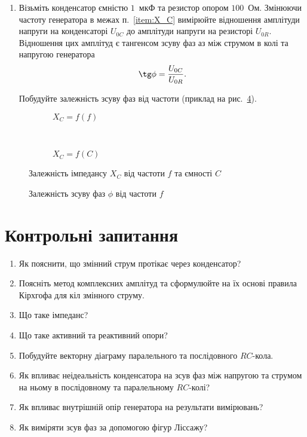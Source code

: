 \begin{enumerate}[resume]
\item Візьміть конденсатор ємністю $1$~мкФ та резистор опором $100$~Ом. Змінюючи частоту генератора в межах п.~\ref{item:X_C} вимірюйте відношення амплітуди напруги на конденсаторі $U_{0C}$ до амплітуди напруги на резисторі $U_{0R}$. Відношення цих амплітуд є тангенсом зсуву фаз аз між струмом в колі та напругою генератора 
\[
\tg\phi = \frac{U_{0C}}{U_{0R}}.
\] 

Побудуйте залежність зсуву фаз від частоти (приклад на рис.~\ref{fig:tanphi_nu}).
\end{enumerate}

\renewcommand{\floatpagefraction}{.1}
\begin{figure}[htbp!]\centering
\begin{subfigure}[t]{0.7\linewidth}\centering
    
\caption{$X_C = f(f)$}
\label{fig:X_Cnu}
\end{subfigure}
\\
\begin{subfigure}{0.7\linewidth}\centering
    
\caption{$X_C = f(C)$}
\label{fig:X_CC}
\end{subfigure}
\caption{Залежність імпедансу $X_C$ від частоти $f$ та ємності $C$}
\end{figure}

\begin{figure}[h!]\centering
    
    \caption{Залежність зсуву фаз $\phi$ від частоти $f$}
    \label{fig:tanphi_nu}
\end{figure}

\section*{Контрольні запитання}

\begin{enumerate}
	\item Як пояснити, що змінний струм протікає через конденсатор?
	\item Поясніть метод комплексних амплітуд та сформулюйте на їх основі правила Кірхгофа для кіл змінного струму.
	\item Що таке імпеданс?
	\item Що таке активний та реактивний опори?
	\item Побудуйте векторну діаграму паралельного та послідовного $RC$-кола.
	\item Як впливає неідеальність конденсатора на зсув фаз між напругою та струмом на ньому в послідовному та паралельному $RC$-колі?
    \item Як впливає внутрішній опір генератора на результати вимірювань?
    \item Як виміряти зсув фаз за допомогою фігур Ліссажу?
\end{enumerate}

